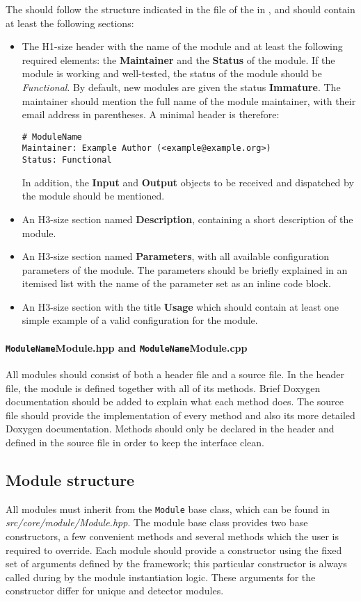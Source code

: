 The  should follow the structure indicated in the  file of the  in , and should contain at least the following sections:
\begin{itemize}
\item The H1-size header with the name of the module and at least the following required elements: the \textbf{Maintainer} and the \textbf{Status} of the module.
If the module is working and well-tested, the status of the module should be \textit{Functional}.
By default, new modules are given the status \textbf{Immature}.
The maintainer should mention the full name of the module maintainer, with their email address in parentheses.
A minimal header is therefore:
\begin{verbatim}
# ModuleName
Maintainer: Example Author (<example@example.org>)
Status: Functional
\end{verbatim}
In addition, the \textbf{Input} and \textbf{Output} objects to be received and dispatched by the module should be mentioned.
\item An H3-size section named \textbf{Description}, containing a short description of the module.
\item An H3-size section named \textbf{Parameters}, with all available configuration parameters of the module.
The parameters should be briefly explained in an itemised list with the name of the parameter set as an inline code block.
\item An H3-size section with the title \textbf{Usage} which should contain at least one simple example of a valid configuration for the module.
\end{itemize}

\paragraph{\texttt{ModuleName}Module.hpp and \texttt{ModuleName}Module.cpp}
All modules should consist of both a header file and a source file.
In the header file, the module is defined together with all of its methods.
Brief Doxygen documentation should be added to explain what each method does.
The source file should provide the implementation of every method and also its more detailed Doxygen documentation.
Methods should only be declared in the header and defined in the source file in order to keep the interface clean.

\subsection{Module structure}
\label{sec:module_structure}
All modules must inherit from the \texttt{Module} base class, which can be found in \textit{src/core/module/Module.hpp}.
The module base class provides two base constructors, a few convenient methods and several methods which the user is required to override.
Each module should provide a constructor using the fixed set of arguments defined by the framework; this particular constructor is always called during by the module instantiation logic.
These arguments for the constructor differ for unique and detector modules.

